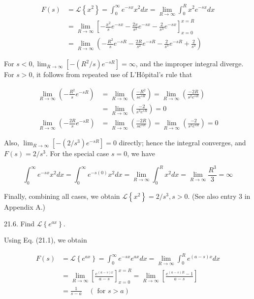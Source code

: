 \documentclass[10pt]{article}
\begin{document}
$$
\begin{aligned}
F(s) & =\mathscr{L}\left\{x^{2}\right\}=\int_{0}^{\infty} e^{-s x} x^{2} d x=\lim _{R \rightarrow \infty} \int_{0}^{R} x^{2} e^{-s x} d x \\
& =\lim _{R \rightarrow \infty}\left[-\frac{x^{2}}{s} e^{-s x}-\frac{2 x}{s^{2}} e^{-s x}-\frac{2}{s^{3}} e^{-s x}\right]_{x=0}^{x=R} \\
& =\lim _{R \rightarrow \infty}\left(-\frac{R^{2}}{s} e^{-s R}-\frac{2 R}{s^{2}} e^{-s R}-\frac{2}{s^{3}} e^{-s R}+\frac{2}{s^{3}}\right)
\end{aligned}
$$

For $s<0, \lim _{R \rightarrow \infty}\left[-\left(R^{2} / s\right) e^{-s R}\right]=\infty$, and the improper integral diverge. For $s>0$, it follows from repeated use of L'Hôpital's rule that

$$
\begin{aligned}
\lim _{R \rightarrow \infty}\left(-\frac{R^{2}}{s} e^{-s R}\right) & =\lim _{R \rightarrow \infty}\left(\frac{-R^{2}}{s e^{s R}}\right)=\lim _{R \rightarrow \infty}\left(\frac{-2 R}{s^{2} e^{s R}}\right) \\
& =\lim _{R \rightarrow \infty}\left(\frac{-2}{s^{3} e^{s R}}\right)=0 \\
\lim _{R \rightarrow \infty}\left(-\frac{2 R}{s} e^{-s R}\right) & =\lim _{R \rightarrow \infty}\left(\frac{-2 R}{s e^{s R}}\right)=\lim _{R \rightarrow \infty}\left(\frac{-2}{s^{2} e^{s R}}\right)=0
\end{aligned}
$$

Also, $\lim _{R \rightarrow \infty}\left[-\left(2 / s^{3}\right) e^{-s R}\right]=0$ directly; hence the integral converges, and $F(s)=2 / s^{3}$. For the special case $s=0$, we have

$$
\int_{0}^{\infty} e^{-s x} x^{2} d x=\int_{0}^{\infty} e^{-s(0)} x^{2} d x=\lim _{R \rightarrow \infty} \int_{0}^{R} x^{2} d x=\lim _{R \rightarrow \infty} \frac{R^{3}}{3}=\infty
$$

Finally, combining all cases, we obtain $\mathscr{L}\left\{x^{2}\right\}=2 / s^{3}, s>0$. (See also entry 3 in Appendix A.)

21.6. Find $\mathscr{L}\left\{e^{a x}\right\}$.

Using Eq. (21.1), we obtain

$$
\begin{aligned}
F(s) & =\mathscr{L}\left\{e^{a x}\right\}=\int_{0}^{\infty} e^{-s x} e^{a x} d x=\lim _{R \rightarrow \infty} \int_{0}^{R} e^{(a-s) x} d x \\
& =\lim _{R \rightarrow \infty}\left[\frac{e^{(a-s) x}}{a-s}\right]_{x=0}^{x=R}=\lim _{R \rightarrow \infty}\left[\frac{e^{(a-s) R}-1}{a-s}\right] \\
& =\frac{1}{s-a} \quad(\text { for } s>a)
\end{aligned}
$$
\end{document}
